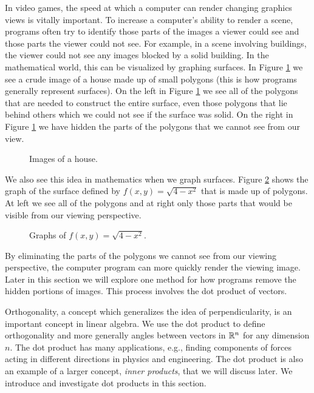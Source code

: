  In video games, the speed at which a computer can render changing graphics views is vitally important. To increase a computer's ability to render a scene, programs often try to identify those parts of the images a viewer could see and those parts the viewer could not see. For example, in a scene involving buildings, the viewer could not see any images blocked by a solid building. In the mathematical world, this can be visualized by graphing surfaces. In  Figure \ref{F:House} we see a crude image of a house made up of small polygons (this is how programs generally represent surfaces). On the left in Figure \ref{F:House} we see all of the polygons that are needed to construct the entire surface, even those polygons that lie behind others which we could not see if the surface was solid. On the right in Figure \ref{F:House} we have hidden the parts of the polygons that we cannot see from our view. 
 \begin{figure}[ht] 
\begin{center}
\caption{Images of a house.}
\label{F:House}
\end{center}
\end{figure}
We also see this idea in mathematics when we graph surfaces. Figure \ref{F:Surface} shows the graph of the surface defined by $f(x,y) = \sqrt{4-x^2}$ that is made up of polygons. At left we see all of the polygons and at right only those parts that would be visible from our viewing perspective. 
\begin{figure}[h]
\begin{center}
 \hspace{0.1in} 
\end{center}
\caption{Graphs of $f(x,y) = \sqrt{4-x^2}$.}
\label{F:Surface}
\end{figure}
By eliminating the parts of the polygons we cannot see from our viewing perspective, the computer program can more quickly render the viewing image. Later in this section we will explore one method for how programs remove the hidden portions of images. This process involves the dot product of vectors.  


Orthogonality, a concept which generalizes the idea of perpendicularity, is an important concept in linear algebra. We use the dot product to define orthogonality and more generally angles between vectors in $\mathbb{R}^n$ for any dimension $n$. The dot product has many applications, e.g., finding components of forces acting in different directions in physics and engineering. The dot product is also an example of a larger concept, \emph{inner products}, that we will discuss later. We introduce and investigate dot products in this section.

